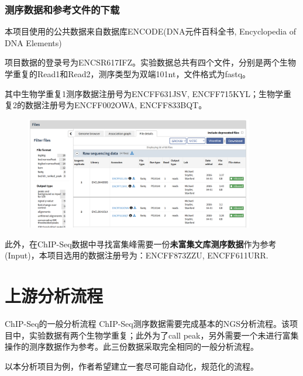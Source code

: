 \subsubsection{测序数据和参考文件的下载}
本项目使用的公共数据来自数据库ENCODE(DNA元件百科全书, Encyclopedia of DNA Elements) \par
项目数据的登录号为ENCSR617IFZ。实验数据总共有四个文件，分别是两个生物学重复的Read1和Read2，测序类型为双端101nt，文件格式为fastq。\par
其中生物学重复1测序数据注册号为ENCFF631JSV, ENCFF715KYL；生物学重复2的数据注册号为ENCFF002OWA, ENCFF833BQT。\par

\begin{figure}[ht]
    \centering
    \includegraphics[width=10cm]{figure/encode_download.png}
\end{figure}
此外，在ChIP-Seq数据中寻找富集峰需要一份\textbf{未富集文库测序数据}作为参考(Input)，本项目选用的数据注册号为：ENCFF873ZZU, ENCFF611URR.

\section{上游分析流程}
ChIP-Seq的一般分析流程
ChIP-Seq测序数据需要完成基本的NGS分析流程。该项目中，实验数据有两个生物学重复；此外为了call peak，另外需要一个未进行富集操作的测序数据作为参考。此三份数据采取完全相同的一般分析流程。\par
以本分析项目为例，作者希望建立一套尽可能自动化，规范化的流程。


